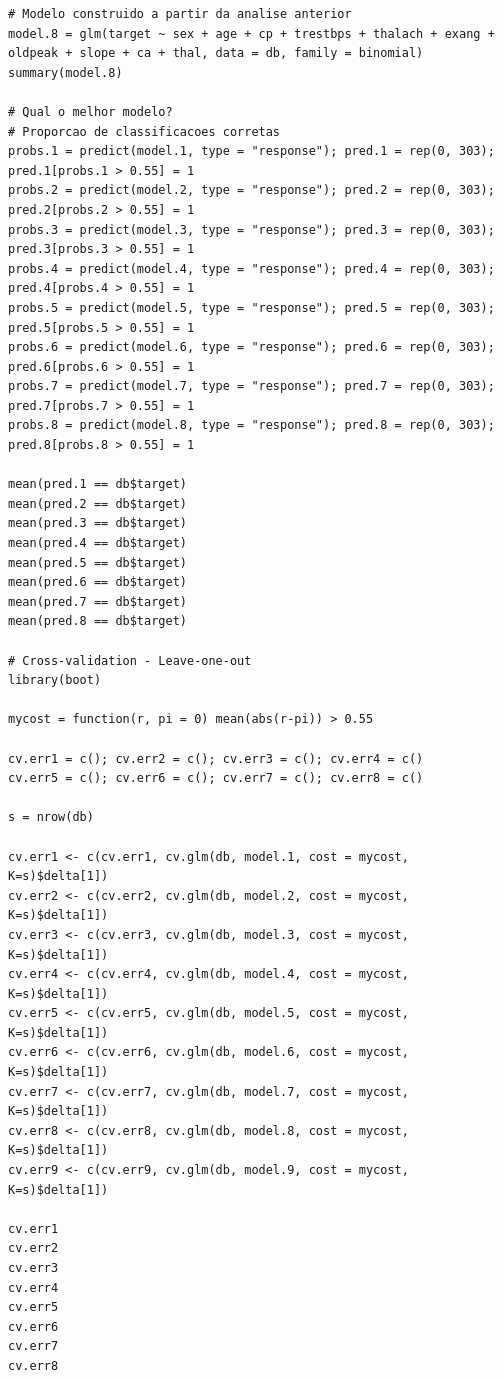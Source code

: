 \documentclass[a4paper]{report}
\begin{document}
\begin{lstlisting}[breaklines,basicstyle=\small]
# Modelo construido a partir da analise anterior
model.8 = glm(target ~ sex + age + cp + trestbps + thalach + exang + oldpeak + slope + ca + thal, data = db, family = binomial)
summary(model.8)

# Qual o melhor modelo?
# Proporcao de classificacoes corretas
probs.1 = predict(model.1, type = "response"); pred.1 = rep(0, 303); pred.1[probs.1 > 0.55] = 1 
probs.2 = predict(model.2, type = "response"); pred.2 = rep(0, 303); pred.2[probs.2 > 0.55] = 1 
probs.3 = predict(model.3, type = "response"); pred.3 = rep(0, 303); pred.3[probs.3 > 0.55] = 1 
probs.4 = predict(model.4, type = "response"); pred.4 = rep(0, 303); pred.4[probs.4 > 0.55] = 1 
probs.5 = predict(model.5, type = "response"); pred.5 = rep(0, 303); pred.5[probs.5 > 0.55] = 1 
probs.6 = predict(model.6, type = "response"); pred.6 = rep(0, 303); pred.6[probs.6 > 0.55] = 1 
probs.7 = predict(model.7, type = "response"); pred.7 = rep(0, 303); pred.7[probs.7 > 0.55] = 1
probs.8 = predict(model.8, type = "response"); pred.8 = rep(0, 303); pred.8[probs.8 > 0.55] = 1

mean(pred.1 == db$target)
mean(pred.2 == db$target)
mean(pred.3 == db$target)
mean(pred.4 == db$target)
mean(pred.5 == db$target)
mean(pred.6 == db$target)
mean(pred.7 == db$target)
mean(pred.8 == db$target)

# Cross-validation - Leave-one-out
library(boot)

mycost = function(r, pi = 0) mean(abs(r-pi)) > 0.55

cv.err1 = c(); cv.err2 = c(); cv.err3 = c(); cv.err4 = c()
cv.err5 = c(); cv.err6 = c(); cv.err7 = c(); cv.err8 = c()

s = nrow(db)

cv.err1 <- c(cv.err1, cv.glm(db, model.1, cost = mycost, K=s)$delta[1])
cv.err2 <- c(cv.err2, cv.glm(db, model.2, cost = mycost, K=s)$delta[1])
cv.err3 <- c(cv.err3, cv.glm(db, model.3, cost = mycost, K=s)$delta[1])
cv.err4 <- c(cv.err4, cv.glm(db, model.4, cost = mycost, K=s)$delta[1])
cv.err5 <- c(cv.err5, cv.glm(db, model.5, cost = mycost, K=s)$delta[1])
cv.err6 <- c(cv.err6, cv.glm(db, model.6, cost = mycost, K=s)$delta[1])
cv.err7 <- c(cv.err7, cv.glm(db, model.7, cost = mycost, K=s)$delta[1])
cv.err8 <- c(cv.err8, cv.glm(db, model.8, cost = mycost, K=s)$delta[1])
cv.err9 <- c(cv.err9, cv.glm(db, model.9, cost = mycost, K=s)$delta[1])

cv.err1
cv.err2
cv.err3
cv.err4
cv.err5
cv.err6
cv.err7
cv.err8
\end{lstlisting}
\end{document}
